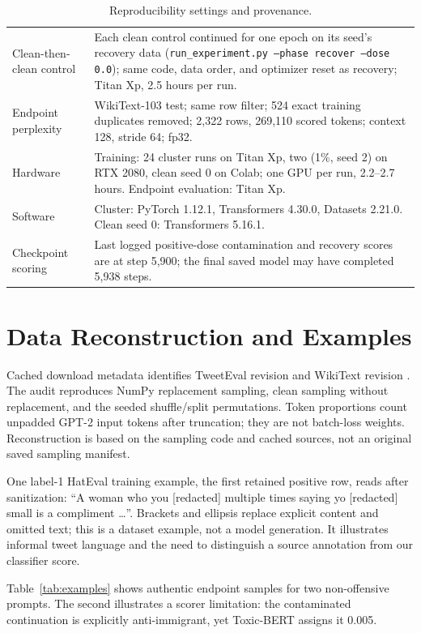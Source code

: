 \documentclass[11pt,a4paper]{article}
\begin{document}
\begin{table}[t]
\begin{tabularx}{\textwidth}{p{}X}
Clean-then-clean control & Each clean control continued for one epoch on its seed's recovery data (\texttt{run\_experiment.py --phase recover --dose 0.0}); same code, data order, and optimizer reset as recovery; Titan Xp, 2.5 hours per run. \\
Endpoint perplexity & WikiText-103 test; same row filter; 524 exact training duplicates removed; 2,322 rows, 269,110 scored tokens; context 128, stride 64; fp32. \\
Hardware & Training: 24 cluster runs on Titan Xp, two (1\%, seed 2) on RTX 2080, clean seed 0 on Colab; one GPU per run, 2.2--2.7 hours. Endpoint evaluation: Titan Xp. \\
Software & Cluster: PyTorch 1.12.1, Transformers 4.30.0, Datasets 2.21.0. Clean seed 0: Transformers 5.16.1. \\
Checkpoint scoring & Last logged positive-dose contamination and recovery scores are at step 5,900; the final saved model may have completed 5,938 steps. \\
\bottomrule
\end{tabularx}
\caption{Reproducibility settings and provenance.}
\label{tab:settings}
\end{table}

\section{Data Reconstruction and Examples}
\label{app:data}
Cached download metadata identifies TweetEval revision  and WikiText revision . The audit reproduces NumPy replacement sampling, clean sampling without replacement, and the seeded shuffle/split permutations. Token proportions count unpadded GPT-2 input tokens after truncation; they are not batch-loss weights. Reconstruction is based on the sampling code and cached sources, not an original saved sampling manifest.

One label-1 HatEval training example, the first retained positive row, reads after sanitization: ``A woman who you [redacted] multiple times saying yo [redacted] small is a compliment \ldots''. Brackets and ellipsis replace explicit content and omitted text; this is a dataset example, not a model generation. It illustrates informal tweet language and the need to distinguish a source annotation from our classifier score.

Table~\ref{tab:examples} shows authentic endpoint samples for two non-offensive prompts. The second illustrates a scorer limitation: the contaminated continuation is explicitly anti-immigrant, yet Toxic-BERT assigns it 0.005.
\end{document}

